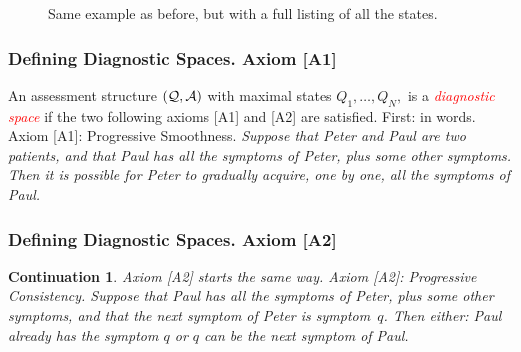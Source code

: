 \documentclass{beamer}
\newtheorem{continuation}[theorem]{Continuation}
\def\tl{\vskip 2mm}
\def\wl{\vskip 4mm}
\def\AAA{{\cal A}}
\def\QQQ{{\cal Q}}
\def\pha{\phantom}
\def\rtxt#1{\textcolor{red}{#1}}
\begin{document}
\begin{frame}
\begin{figure}[h]
 \hspace{-4.7cm}
\begin{minipage}{5.5cm}\small  Same example as before, but with a full  listing of all the states.  \end{minipage}

\vspace{2.8cm}

\end{figure}
\end{frame}

  \begin{frame}
  \frametitle{Defining Diagnostic Spaces. Axiom [A1]}
   \center
   \begin{minipage}{10cm}\small
     \begin{definition}
  An assessment structure $(\QQQ,\AAA)$ with maximal states $Q_1,\ldots,Q_N,$  is a \rtxt{\sl diagnostic space} if the two following axioms [A1] and [A2] are satisfied.
\tl
{\sc First: in words.}  
   \wl
{\sc Axiom [A1]: Progressive Smoothness.} {\sl Suppose that Peter and Paul are two patients, and that   Paul has all the symptoms of Peter, plus some other symptoms.  Then it is possible for Peter to gradually acquire, one by one, all the symptoms of  Paul.} 
\pha{xxxx}

\pha{xxxx}

\end{definition}
\end{minipage}
\end{frame}
  \begin{frame}
  \frametitle{Defining Diagnostic Spaces. Axiom [A2]}
   \center
   \begin{minipage}{10cm}\small
     \begin{continuation}
    {\sc  Axiom [A2] starts the same way.}
  \wl
 {\sc Axiom [A2]: Progressive Consistency.}  {\sl  Suppose that   Paul has all the symptoms of  Peter, plus some other symptoms,  and that  the next symptom of Peter is symptom~$q$.  Then either: Paul already has the symptom $q$ or $q$ can be the next symptom of Paul.}
 \pha{xxxx}

\pha{xxxx}
\end{continuation}
\end{minipage}
\end{frame}
\end{document}
